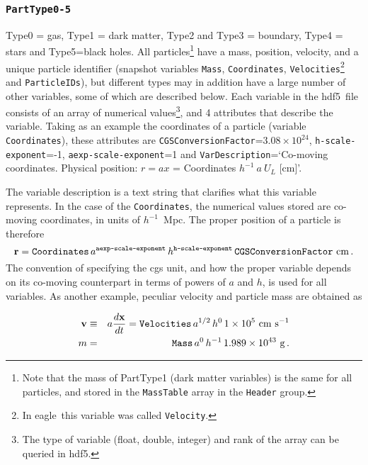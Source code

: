\documentclass[10pt, a4paper]{article}
\newcommand{\eagle}{{\sc eagle}}
\newcommand{\hdf}{{\sc hdf5}}
\begin{document}
\subsubsection{\texttt{PartType0-5}}
\label{sect:part}
Type0 = gas, Type1 = dark matter, Type2 and Type3 = boundary, Type4 = stars and
Type5=black holes. All particles\footnote{Note that the mass of PartType1 (dark
matter variables) is the same for all particles, and stored in the
\texttt{MassTable} array in the \texttt{Header} group.} have a mass, position,
velocity, and a unique particle identifier (snapshot variables \texttt{Mass},
\texttt{Coordinates}, \texttt{Velocities}\footnote{In \eagle\ this variable was called \texttt{Velocity}.} and \texttt{ParticleIDs}), but
different types may in addition have a large number of other variables, some of
which are described below. Each variable in the \hdf\ file consists of an array
of numerical values\footnote{The type of variable (float, double, integer) and
rank of the array can be queried in \hdf.}, and 4 attributes that describe the
variable.  Taking as an example the coordinates of a particle (variable
\texttt{Coordinates}), these attributes are
\texttt{CGSConversionFactor}=$3.08\times 10^{24}$,
\texttt{h-scale-exponent}=-1, \texttt{aexp-scale-exponent}=1 and
\texttt{VarDescription}=\lq Co-moving coordinates. Physical position: $r =
ax$ = Coordinates $h^{-1}~a~U_L$ [cm]\rq. 

The variable description is a text string that clarifies what this variable
represents. In the case of the \texttt{Coordinates}, the numerical values
stored are co-moving coordinates, in units of $h^{-1}$~Mpc. The proper position
of a particle is therefore \begin{equation} {\bf r} =
\texttt{Coordinates}\,a^\texttt{aexp-scale-exponent}\,h^\texttt{h-scale-exponent}\,\texttt{CGSConversionFactor}~{\rm
cm}\,.  \label{eq:coordinates} \end{equation} The convention of specifying the
cgs unit, and how the proper variable depends on its co-moving counterpart in
terms of powers of $a$ and $h$, is used for all variables. As another example,
peculiar velocity and particle mass are obtained as

\begin{eqnarray}
{\bf v}&\equiv& a{d{\bf x}\over dt} = \texttt{Velocities}\,a^{1/2}\,h^0\,1\times 10^5~{\rm cm~s}^{-1}\nonumber\\
m &=& \texttt{Mass}\,a^0\,h^{-1}\,1.989\times 10^{43}~{\rm g}\,.	
\end{eqnarray}
\end{document}
